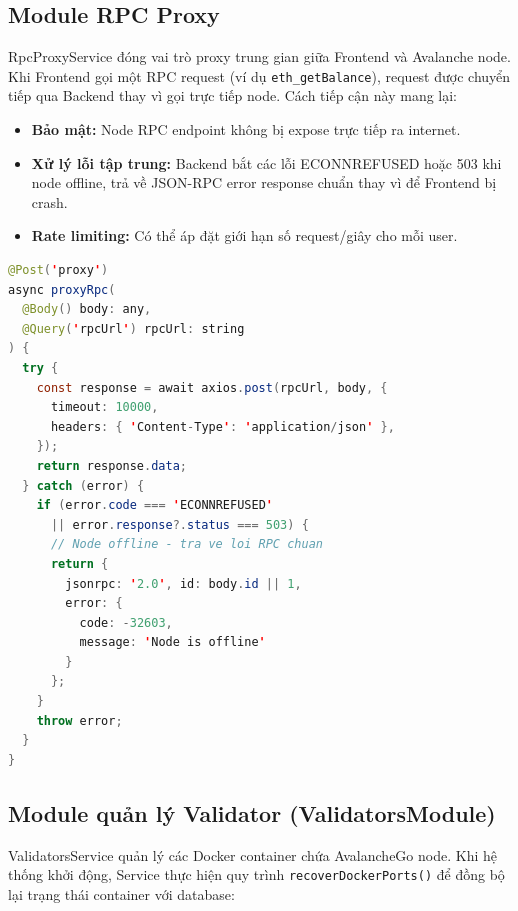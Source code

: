 \subsection{Module RPC Proxy}

RpcProxyService đóng vai trò proxy trung gian giữa Frontend và Avalanche node. Khi Frontend gọi một RPC request (ví dụ \texttt{eth\_getBalance}), request được chuyển tiếp qua Backend thay vì gọi trực tiếp node. Cách tiếp cận này mang lại:

\begin{itemize}
    \item \textbf{Bảo mật:} Node RPC endpoint không bị expose trực tiếp ra internet.
    \item \textbf{Xử lý lỗi tập trung:} Backend bắt các lỗi ECONNREFUSED hoặc 503 khi node offline, trả về JSON-RPC error response chuẩn thay vì để Frontend bị crash.
    \item \textbf{Rate limiting:} Có thể áp đặt giới hạn số request/giây cho mỗi user.
\end{itemize}

\begin{lstlisting}[caption={RpcProxyService --- Chuyển tiếp JSON-RPC}, label={lst:rpc_proxy}, language=Java]
@Post('proxy')
async proxyRpc(
  @Body() body: any,
  @Query('rpcUrl') rpcUrl: string
) {
  try {
    const response = await axios.post(rpcUrl, body, {
      timeout: 10000,
      headers: { 'Content-Type': 'application/json' },
    });
    return response.data;
  } catch (error) {
    if (error.code === 'ECONNREFUSED'
      || error.response?.status === 503) {
      // Node offline - tra ve loi RPC chuan
      return {
        jsonrpc: '2.0', id: body.id || 1,
        error: {
          code: -32603,
          message: 'Node is offline'
        }
      };
    }
    throw error;
  }
}
\end{lstlisting}

\subsection{Module quản lý Validator (ValidatorsModule)}

ValidatorsService quản lý các Docker container chứa AvalancheGo node. Khi hệ thống khởi động, Service thực hiện quy trình \texttt{recoverDockerPorts()} để đồng bộ lại trạng thái container với database:

